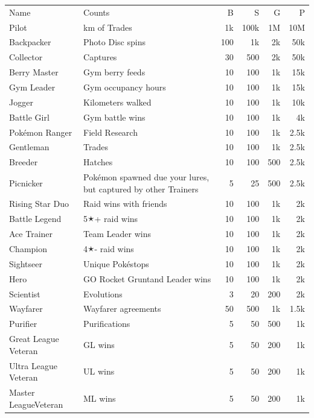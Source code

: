 \begin{table}[th]
\setlength{\tabcolsep}{1pt}
\footnotesize
\begin{tabular}{p{}p{}rrrr}
Name & Counts & B & S & G & P\\
\Midrule%
Pilot & km of Trades & 1k & 100k & 1M & 10M\\
Backpacker & Photo Disc spins & 100 & 1k & 2k & 50k\\
Collector & Captures & 30 & 500 & 2k & 50k\\
Berry Master & Gym berry feeds & 10 & 100 & 1k & 15k\\
Gym Leader & Gym occupancy hours & 10 & 100 & 1k & 15k\\
Jogger & Kilometers walked & 10 & 100 & 1k & 10k\\
Battle Girl & Gym battle wins & 10 & 100 & 1k & 4k\\
Pokémon Ranger & Field Research & 10 & 100 & 1k & 2.5k\\
Gentleman & Trades & 10 & 100 & 1k & 2.5k\\
Breeder & Hatches & 10 & 100 & 500 & 2.5k\\
Picnicker & Pokémon spawned due your lures, but captured by other Trainers & 5 & 25 & 500 & 2.5k\\
Rising Star Duo & Raid wins with friends & 10 & 100 & 1k & 2k\\
Battle Legend & 5🟉+ raid wins & 10 & 100 & 1k & 2k\\
Ace Trainer & Team Leader wins & 10 & 100 & 1k & 2k\\
Champion & 4🟉- raid wins & 10 & 100 & 1k & 2k\\
Sightseer & Unique Pokéstops & 10 & 100 & 1k & 2k\\
Hero & GO Rocket Grunt\newline{}and Leader wins & 10 & 100 & 1k & 2k\\
Scientist & Evolutions & 3 & 20 & 200 & 2k\\
Wayfarer & Wayfarer agreements & 50 & 500 & 1k & 1.5k\\
Purifier & Purifications & 5 & 50 & 500 & 1k\\
Great League Veteran & GL wins & 5 & 50 & 200 & 1k\\
Ultra League Veteran & UL wins & 5 & 50 & 200 & 1k\\
Master League\newline{}Veteran & ML wins & 5 & 50 & 200 & 1k\\

\end{tabular}
\end{table}

